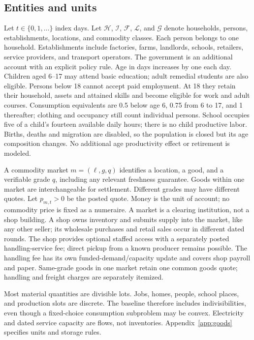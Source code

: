 \documentclass[10pt,a4paper,twocolumn]{article}
\newcommand{\HH}{\mathcal H}
\begin{document}
\subsection{Entities and units}
Let $t\in\{0,1,\ldots\}$ index days. Let $\HH$, $\mathcal I$,
$\mathcal F$, $\mathcal L$, and $\mathcal G$ denote households,
persons, establishments, locations, and commodity classes. Each person
belongs to one household. Establishments include factories, farms,
landlords, schools, retailers, service providers, and transport operators.
The government is an additional account with an explicit policy rule.
Age in days increases by one each day. Children aged 6--17 may attend
basic education; adult remedial students are also eligible. Persons below
18 cannot accept paid employment. At 18 they retain their household,
assets and attained skills and become eligible for work and adult courses.
Consumption equivalents are 0.5 below age 6, 0.75 from 6 to 17, and 1
thereafter; clothing and occupancy still count individual persons.
School occupies five of a child's fourteen available daily hours;
there is no child productive labor. Births, deaths and migration are
disabled, so the population is closed but its age composition changes.
No additional age productivity effect or retirement is modeled.

A commodity market $m=(\ell,g,q)$ identifies a location, a good, and a
verifiable grade $q$, including any relevant freshness guarantee. Goods
within one market are interchangeable for settlement. Different grades
may have different quotes. Let $p_{m,t}>0$ be the posted quote. Money is
the unit of account; no commodity price is fixed as a numeraire.
A market is a clearing institution, not a shop building. A shop owns
inventory and submits supply into the market, like any other seller;
its wholesale purchases and retail sales occur in different dated rounds.
The shop provides optional staffed access with a separately posted
handling-service fee; direct pickup from a known producer remains possible.
The handling fee has its own funded-demand/capacity update and covers
shop payroll and paper. Same-grade goods in one market retain one common
goods quote; handling and freight charges are separately itemized.

Most material quantities are divisible lots. Jobs, homes, people, school
places, and production slots are discrete. The baseline therefore includes
indivisibilities, even though a fixed-choice consumption subproblem may
be convex. Electricity and dated service capacity are flows, not
inventories. Appendix~\ref{app:goods} specifies units and storage rules.
\end{document}
